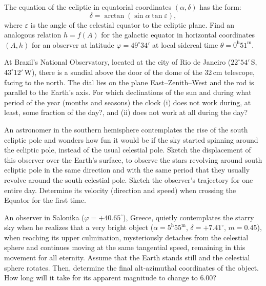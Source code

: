 The equation of the ecliptic in equatorial coordinates $(\alpha, \delta)$ has
the form:
\[ \delta = \arctan(\sin\alpha \tan\varepsilon), \]
where $\varepsilon$ is the angle of the celestial equator to the ecliptic
plane. Find an analogous relation $h = f(A)$ for the galactic equator in
horizontal coordinates $(A, h)$ for an observer at latitude
$\varphi = 49^\circ 34'$ at local sidereal time
$\theta = 0^{\mathrm{h}}51^{\mathrm{m}}$.

At Brazil's National Observatory, located at the city of Rio de Janeiro
($22^\circ 54'$\,S, $43^\circ 12'$\,W), there is a sundial above the door of
the dome of the 32\,cm telescope, facing to the north. The dial lies on the
plane East--Zenith--West and the rod is parallel to the Earth's axis. For
which declinations of the sun and during what period of the year (months and
seasons) the clock (i) does not work during, at least, some fraction of the
day?, and (ii) does not work at all during the day?

An astronomer in the southern hemisphere contemplates the rise of the south
ecliptic pole and wonders how fun it would be if the sky started spinning
around the ecliptic pole, instead of the usual celestial pole. Sketch the
displacement of this observer over the Earth's surface, to observe the stars
revolving around south ecliptic pole in the same direction and with the same
period that they usually revolve around the south celestial pole. Sketch the
observer's trajectory for one entire day. Determine its velocity (direction
and speed) when crossing the Equator for the first time.

An observer in Salonika ($\varphi = +40.65^\circ$), Greece, quietly
contemplates the starry sky when he realizes that a very bright object
($\alpha = 5^{\mathrm{h}}55^{\mathrm{m}}$, $\delta = +7.41^\circ$,
$m = 0.45$), when reaching its upper culmination, mysteriously detaches from
the celestial sphere and continues moving at the same tangential speed,
remaining in this movement for all eternity. Assume that the Earth stands
still and the celestial sphere rotates. Then, determine the final
alt-azimuthal coordinates of the object. How long will it take for its
apparent magnitude to change to 6.00?

